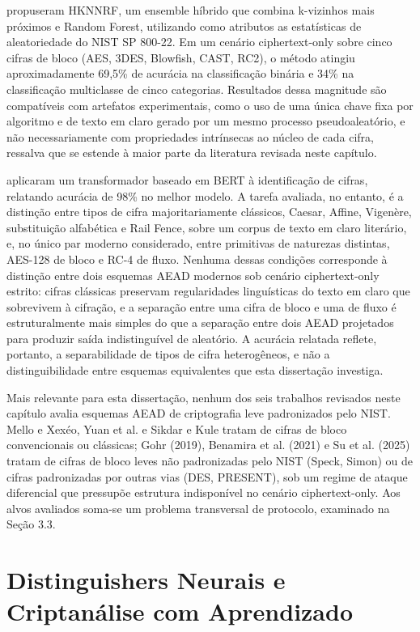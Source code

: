  propuseram HKNNRF, um ensemble híbrido que combina k-vizinhos mais próximos e Random Forest, utilizando como atributos as estatísticas de aleatoriedade do NIST SP 800-22. Em um cenário ciphertext-only sobre cinco cifras de bloco (AES, 3DES, Blowfish, CAST, RC2), o método atingiu aproximadamente 69,5\% de acurácia na classificação binária e 34\% na classificação multiclasse de cinco categorias. Resultados dessa magnitude são compatíveis com artefatos experimentais, como o uso de uma única chave fixa por algoritmo e de texto em claro gerado por um mesmo processo pseudoaleatório, e não necessariamente com propriedades intrínsecas ao núcleo de cada cifra, ressalva que se estende à maior parte da literatura revisada neste capítulo.

 aplicaram um transformador baseado em BERT à identificação de cifras, relatando acurácia de 98\% no melhor modelo. A tarefa avaliada, no entanto, é a distinção entre tipos de cifra majoritariamente clássicos, Caesar, Affine, Vigenère, substituição alfabética e Rail Fence, sobre um corpus de texto em claro literário, e, no único par moderno considerado, entre primitivas de naturezas distintas, AES-128 de bloco e RC-4 de fluxo. Nenhuma dessas condições corresponde à distinção entre dois esquemas AEAD modernos sob cenário ciphertext-only estrito: cifras clássicas preservam regularidades linguísticas do texto em claro que sobrevivem à cifração, e a separação entre uma cifra de bloco e uma de fluxo é estruturalmente mais simples do que a separação entre dois AEAD projetados para produzir saída indistinguível de aleatório. A acurácia relatada reflete, portanto, a separabilidade de tipos de cifra heterogêneos, e não a distinguibilidade entre esquemas equivalentes que esta dissertação investiga.


Mais relevante para esta dissertação, nenhum dos seis trabalhos revisados neste capítulo avalia esquemas AEAD de criptografia leve padronizados pelo NIST. Mello e Xexéo, Yuan et al. e Sikdar e Kule tratam de cifras de bloco convencionais ou clássicas; Gohr (2019), Benamira et al. (2021) e Su et al. (2025) tratam de cifras de bloco leves não padronizadas pelo NIST (Speck, Simon) ou de cifras padronizadas por outras vias (DES, PRESENT), sob um regime de ataque diferencial que pressupõe estrutura indisponível no cenário ciphertext-only. Aos alvos avaliados soma-se um problema transversal de protocolo, examinado na Seção 3.3.


\section{Distinguishers Neurais e Criptanálise com Aprendizado}

